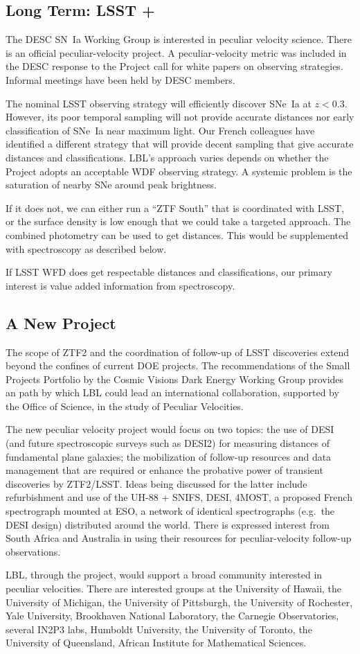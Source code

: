 \subsection{Long Term: LSST +}
The DESC SN~Ia Working Group is interested in peculiar velocity science.  There is an official peculiar-velocity project.  A peculiar-velocity
metric was included in the DESC response to the Project call for white papers on observing strategies.
Informal meetings have been held by DESC members.

The nominal LSST observing strategy will efficiently discover SNe~Ia at $z<0.3$.  However, its poor temporal sampling will not provide accurate
distances nor early classification of SNe~Ia near maximum light.  Our French colleagues have identified a different strategy that will provide
decent sampling that give accurate distances and classifications.  LBL's approach varies depends on whether the Project adopts an acceptable
WDF observing strategy.  A systemic problem is the saturation of nearby SNe around peak brightness.

If it does not, we can either run a ``ZTF South'' that is coordinated with LSST, or the surface density is low enough that we could take
a targeted approach.  The combined photometry can be used to get distances.  This would be supplemented with spectroscopy as described below.

If LSST WFD does get respectable distances and classifications, our primary interest is value added information from spectroscopy.

\subsection{A New Project}
The scope of ZTF2 and the coordination of follow-up of LSST discoveries extend beyond the confines
of current DOE projects.  The recommendations
of the  Small Projects Portfolio  by the  Cosmic Visions Dark Energy Working Group
provides an path by which LBL could lead an international collaboration,
supported by the Office of Science, in the study of Peculiar Velocities.

The new peculiar velocity project would focus on two topics: the use of DESI (and future spectroscopic surveys
such as DESI2) for measuring distances of
fundamental plane galaxies; the mobilization of follow-up resources and data management that are required or enhance 
the probative power of transient discoveries by ZTF2/LSST.  Ideas being discussed for the latter include
refurbishment and use of the
UH-88 + SNIFS, DESI, 4MOST, a proposed French spectrograph mounted at ESO,
a network of identical spectrographs (e.g.\ the DESI design) distributed around the world.
There is expressed interest from South Africa and Australia in using their resources for peculiar-velocity follow-up observations.

LBL, through the project, would support a broad community interested in peculiar velocities. 
There are interested groups at the  University of Hawaii, the University of Michigan, the University of Pittsburgh, the University of Rochester, Yale University,  Brookhaven National Laboratory,
the Carnegie Observatories, several IN2P3 labs, Humboldt University, the University of Toronto,  the University of Queensland, African Institute for Mathematical
Sciences.